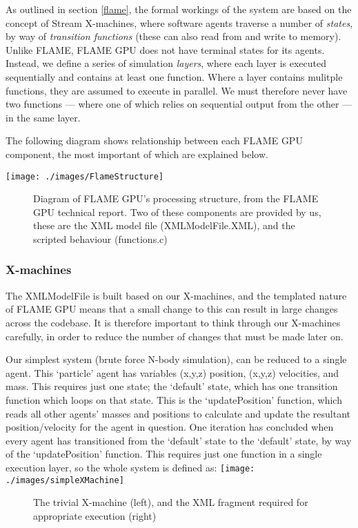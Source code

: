 \documentclass[11pt,a4paper]{article}
\begin{document}
As outlined in section \ref{flame}, the formal workings of the system are based on the concept of Stream X-machines, where software agents traverse a number of \emph{states}, by way of \emph{transition functions} (these can also read from and write to memory). Unlike FLAME, FLAME GPU does not have terminal states for its agents. Instead, we define a series of simulation \emph{layers}, where each layer is executed sequentially and contains at least one function. Where a layer contains mulitple functions, they are assumed to execute in parallel. We must therefore never have two functions --- where one of which relies on sequential output from the other --- in the same layer.

The following diagram shows relationship between each FLAME GPU component, the most important of which are explained below.

\texttt{[image: ./images/FlameStructure]}
\begin{figure}[h!]
\caption [FLAME GPU Structure]{Diagram of FLAME GPU's processing structure, from the FLAME GPU technical report\cite{fgpuTechnical}. Two of these components are provided by us, these are the XML model file (XMLModelFile.XML), and the scripted behaviour (functions.c)}
\end{figure}

\subsubsection{X-machines}

The XMLModelFile is built based on our X-machines, and the templated nature of FLAME GPU means that a small change to this can result in large changes across the codebase. It is therefore important to think through our X-machines carefully, in order to reduce the number of changes that must be made later on.

Our simplest system (brute force N-body simulation), can be reduced to a single agent. This `particle' agent has variables (x,y,z) position, (x,y,z) velocities, and mass. This requires just one state; the `default' state, which has one transition function which loops on that state. This is the `updatePosition' function, which reads all other agents' masses and positions to calculate and update the resultant position/velocity for the agent in question. One iteration has concluded when every agent has transitioned from the `default' state to the `default' state, by way of the `updatePosition' function. This requires just one function in a single execution layer, so the whole system is defined as:
\texttt{[image: ./images/simpleXMachine]}
\begin{figure}[h!]
\caption[Brute force N-body X-machine]{The trivial X-machine (left), and the XML fragment required for appropriate execution (right)}
\end{figure}
\end{document}
